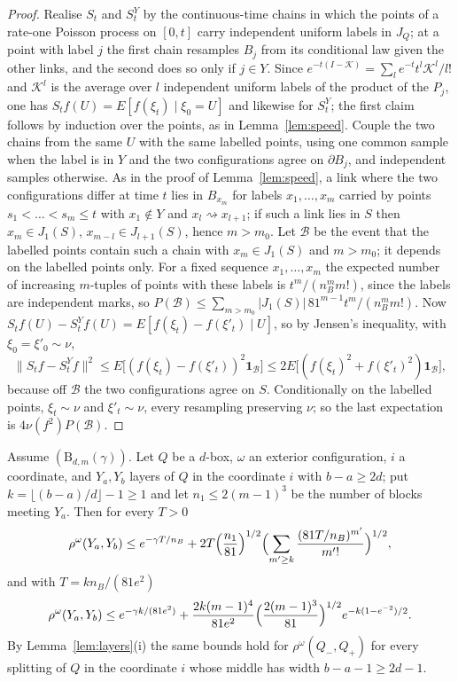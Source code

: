 \begin{proof}
Realise $S_t$ and $S^Y_t$ by the continuous-time chains in which the points
of a rate-one Poisson process on $[0,t]$ carry independent uniform labels in
$J_Q$; at a point with label $j$ the first chain resamples $B_j$ from its
conditional law given the other links, and the second does so only if $j\in
Y$. Since $e^{-t(I-\mathcal K)}=\sum_le^{-t}t^l\mathcal K^l/l!$ and
$\mathcal K^l$ is the average over $l$ independent uniform labels of the
product of the $P_j$, one has $S_tf(U)=E[f(\xi_t)\mid\xi_0=U]$ and likewise
for $S^Y_t$; the first claim follows by induction over the points, as in
Lemma~\ref{lem:speed}. Couple the two chains from the same $U$ with the same
labelled points, using one common sample when the label is in $Y$ and the two
configurations agree on $\partial B_j$, and independent samples otherwise.
As in the proof of Lemma~\ref{lem:speed}, a link where the two configurations
differ at time $t$ lies in $B_{x_m}$ for labels $x_1,\dots,x_m$ carried by
points $s_1<\dots<s_m\le t$ with $x_1\notin Y$ and $x_l\rightsquigarrow
x_{l+1}$; if such a link lies in $S$ then $x_m\in J_1(S)$, $x_{m-l}\in
J_{l+1}(S)$, hence $m>m_0$. Let $\mathcal B$ be the event that the labelled
points contain such a chain with $x_m\in J_1(S)$ and $m>m_0$; it depends on
the labelled points only. For a fixed sequence $x_1,\dots,x_m$ the expected
number of increasing $m$-tuples of points with these labels is $t^m/(n_B^m
m!)$, since the labels are independent marks, so $P(\mathcal B)\le\sum_{m>
m_0}|J_1(S)|\,81^{m-1}t^m/(n_B^mm!)$. Now $S_tf(U)-S^Y_tf(U)=E[f(\xi_t)-
f(\xi'_t)\mid U]$, so by Jensen's inequality, with $\xi_0=\xi'_0\sim\nu$,
\[
\|S_tf-S^Y_tf\|^2\le E\bigl[(f(\xi_t)-f(\xi'_t))^2\mathbf 1_{\mathcal B}\bigr]
\le2E\bigl[(f(\xi_t)^2+f(\xi'_t)^2)\mathbf 1_{\mathcal B}\bigr],
\]
because off $\mathcal B$ the two configurations agree on $S$. Conditionally
on the labelled points, $\xi_t\sim\nu$ and $\xi'_t\sim\nu$, every resampling
preserving $\nu$; so the last expectation is $4\nu(f^2)P(\mathcal B)$.
\end{proof}

\begin{theorem}\label{thm:blockdecay}
Assume $(\mathrm B_{d,m}(\gamma))$. Let $Q$ be a $d$-box, $\omega$ an
exterior configuration, $i$ a coordinate, and $Y_a,Y_b$ layers of $Q$ in the
coordinate $i$ with $b-a\ge2d$; put $k=\lfloor(b-a)/d\rfloor-1\ge1$ and let
$n_1\le2(m-1)^3$ be the number of blocks meeting $Y_a$. Then for every $T>0$
\[
\rho^\omega(Y_a,Y_b)\le e^{-\gamma T/n_B}+2T\Bigl(\frac{n_1}{81}\Bigr)^{1/2}
\Bigl(\sum_{m'\ge k}\frac{(81T/n_B)^{m'}}{m'!}\Bigr)^{1/2},
\]
and with $T=kn_B/(81e^2)$
\[
\rho^\omega(Y_a,Y_b)\le e^{-\gamma k/(81e^2)}+\frac{2k(m-1)^4}{81e^2}\Bigl(
\frac{2(m-1)^3}{81}\Bigr)^{1/2}e^{-k(1-e^{-2})/2}.
\]
By Lemma~\ref{lem:layers}\textup{(i)} the same bounds hold for
$\rho^\omega(Q_-,Q_+)$ for every splitting of $Q$ in the coordinate $i$ whose
middle has width $b-a-1\ge2d-1$.
\end{theorem}

